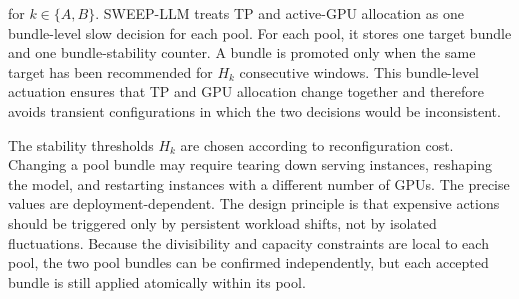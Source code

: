 for $k\in\{A,B\}$. 
SWEEP-LLM treats TP and active-GPU allocation as one bundle-level slow decision for each pool.
For each pool, it stores one target bundle and one bundle-stability counter.
A bundle is promoted only when the same target has been recommended for $H_k$ consecutive windows.
This bundle-level actuation ensures that TP and GPU allocation change together and therefore avoids transient configurations in which the two decisions would be inconsistent.

The stability thresholds $H_k$ are chosen according to reconfiguration cost.
Changing a pool bundle may require tearing down serving instances, reshaping the model, and restarting instances with a different number of GPUs.
The precise values are deployment-dependent.
The design principle is that expensive actions should be triggered only by persistent workload shifts, not by isolated fluctuations.
Because the divisibility and capacity constraints are local to each pool, the two pool bundles can be confirmed independently, but each accepted bundle is still applied atomically within its pool.

